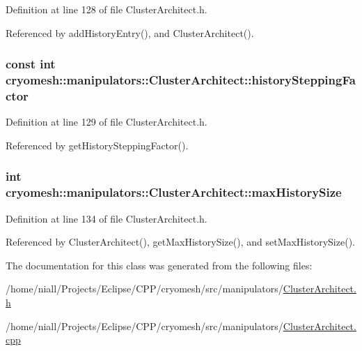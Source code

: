 \-Definition at line 128 of file \-Cluster\-Architect.\-h.



\-Referenced by add\-History\-Entry(), and \-Cluster\-Architect().

\hypertarget{classcryomesh_1_1manipulators_1_1ClusterArchitect_a766f4eb432605c7fff53dae0e8569dd7}{
\subsubsection[{history\-Stepping\-Factor}]{\setlength{\rightskip}{0pt plus 5cm}const int {\bf cryomesh\-::manipulators\-::\-Cluster\-Architect\-::history\-Stepping\-Factor}}}\label{classcryomesh_1_1manipulators_1_1ClusterArchitect_a766f4eb432605c7fff53dae0e8569dd7}


\-Definition at line 129 of file \-Cluster\-Architect.\-h.



\-Referenced by get\-History\-Stepping\-Factor().

\hypertarget{classcryomesh_1_1manipulators_1_1ClusterArchitect_a2a3b819358a723ce61c58063c6adff7f}{
\subsubsection[{max\-History\-Size}]{\setlength{\rightskip}{0pt plus 5cm}int {\bf cryomesh\-::manipulators\-::\-Cluster\-Architect\-::max\-History\-Size}}}\label{classcryomesh_1_1manipulators_1_1ClusterArchitect_a2a3b819358a723ce61c58063c6adff7f}


\-Definition at line 134 of file \-Cluster\-Architect.\-h.



\-Referenced by \-Cluster\-Architect(), get\-Max\-History\-Size(), and set\-Max\-History\-Size().



\-The documentation for this class was generated from the following files\-:\begin{DoxyCompactItemize}
\item 
/home/niall/\-Projects/\-Eclipse/\-C\-P\-P/cryomesh/src/manipulators/\hyperlink{ClusterArchitect_8h}{\-Cluster\-Architect.\-h}\item 
/home/niall/\-Projects/\-Eclipse/\-C\-P\-P/cryomesh/src/manipulators/\hyperlink{ClusterArchitect_8cpp}{\-Cluster\-Architect.\-cpp}\end{DoxyCompactItemize}
